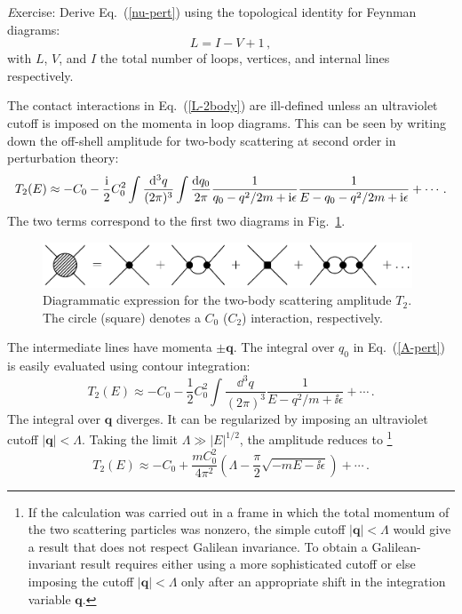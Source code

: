 \begin{prob}
{\emph Exercise:}  Derive Eq.~(\ref{nu-pert}) using the topological
identity for Feynman diagrams:
\begin{equation}
 L=I-V+1\,,
\end{equation}
with $L$, $V$, and $I$ the total number of loops, vertices, and internal lines
respectively. 
\end{prob}

The contact interactions in Eq.~(\ref{L-2body}) are ill-defined unless an
ultraviolet cutoff is imposed on the momenta in loop diagrams.
This can be seen by writing down the off-shell amplitude for two-body
scattering at second order in perturbation theory:
\begin{equation}
 T_2 (E) \approx {-}C_0 - \frac\ii2
 C_0^2 \int \frac{\dd^3q}{(2 \pi)^3}
 \int\frac{\dd q_0}{2 \pi} \frac1{q_0 - q^2 /2m + \ii \epsilon}
 \frac1{E - q_0 - q^2 /2m + \ii\epsilon} + \cdots \,.
\nonumber\\
\label{A-pert}
\end{equation}
The two terms correspond to the first two diagrams in 
Fig.~\ref{fig:amp2}. 
\begin{figure}[htb]
\bigskip
\centerline{\includegraphics*[width=11cm,angle=0]{fig_2bdypert.pdf}}
\medskip
\caption
{Diagrammatic expression for the two-body scattering amplitude $T_2$.
The circle (square) denotes a $C_0$ ($C_2$) interaction, respectively.}
\label{fig:amp2}
\end{figure}
The intermediate lines have momenta $\pm {\bm q}$.
The integral over $q_0$ in Eq.~(\ref{A-pert}) is easily
evaluated using contour integration:
\begin{equation}
 T_2 (E) \approx {-}C_0 - \frac12 C_0^2 
 \int \frac{\dd^3q}{(2 \pi)^3} \frac1{E - q^2/m +\ii \epsilon} + \cdots \,.
\end{equation}
The integral over ${\bm q}$ diverges. It can be regularized by imposing
an ultraviolet
cutoff $|{\bm q}| < \Lambda$. Taking the limit $\Lambda \gg |E|^{1/2}$,
the amplitude reduces to \footnote{
If the calculation was carried out in a
frame in which the total momentum of the two scattering particles was
nonzero, the simple cutoff $|{\bm q}| < \Lambda$ would give a result that does
not respect Galilean invariance. To obtain a Galilean-invariant result 
requires either using a more sophisticated cutoff or else imposing
the cutoff $|{\bm q}| < \Lambda$ only after an
appropriate shift in the integration variable ${\bm q}$.}
\begin{equation}
 T_2 (E) \approx - C_0 + \frac{mC_0^2}{4 \pi^2} 
 \left(\Lambda - \frac{\pi}{2} \sqrt {-mE -\ii \epsilon} \right) + \cdots \,.
\label{amp2-2nd}
\end{equation}


